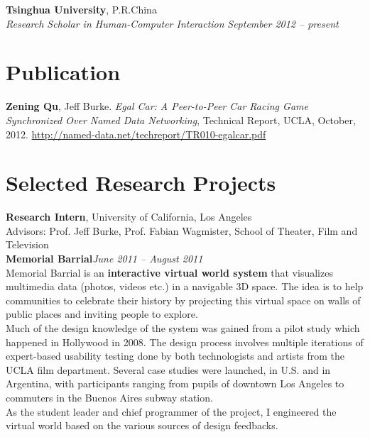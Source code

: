 \documentclass[margin,line]{resume}
\begin{document}
\begin{resume}
     \textbf{Tsinghua University}, P.R.China \vspace{2mm}\\\vspace{1mm}%
    \textsl{Research Scholar in Human-Computer Interaction} \hfill \textsl{September 2012 -- present}\vspace{-3mm}\\\vspace{-1mm}%
    
    \section{\mysidestyle Publication}

    \textbf{Zening Qu}, Jeff Burke. \emph{Egal Car: A Peer-to-Peer Car Racing Game Synchronized Over Named Data Networking}, Technical Report, UCLA, October, 2012. \href{http://named-data.net/techreport/TR010-egalcar.pdf}{\url{http://named-data.net/techreport/TR010-egalcar.pdf}}


    \section{\mysidestyle Selected Research Projects}

    \textbf{Research Intern}, University of California, Los Angeles \\%
    Advisors: Prof. Jeff Burke, Prof. Fabian Wagmister, School of Theater, Film and Television \vspace{2mm}\\
    \textbf{Memorial Barrial}\hfill \textsl{June 2011 -- August 2011}\\
    Memorial Barrial is an \textbf{interactive virtual world system} that visualizes multimedia data (photos, videos etc.) in a navigable 3D space. The idea is to help communities to celebrate their history by projecting this virtual space on walls of public places and inviting people to explore. \\
    Much of the design knowledge of the system was gained from a pilot study which happened in Hollywood in 2008. The design process involves multiple iterations of expert-based usability testing done by both technologists and artists from the UCLA film department. Several case studies were launched, in U.S. and in Argentina, with participants ranging from pupils of downtown Los Angeles to commuters in the Buenos Aires subway station. \\
    As the student leader and chief programmer of the project, I engineered the virtual world based on the various sources of design feedbacks.
    

\end{resume}
\end{document}
